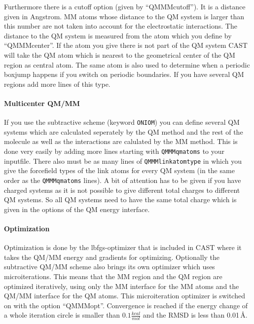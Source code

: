 \documentclass[10pt,a4paper]{article} %
\begin{document}
Furthermore there is a cutoff option (given by ``QMMMcutoff''). It is a distance given in Angstrom. MM atoms whose distance to the QM system is larger than this number are not taken into account for the electrostatic interactions. The distance to the QM system is measured from the atom which you define by ``QMMMcenter''. If the atom you give there is not part of the QM system CAST will take the QM atom which is nearest to the geometrical center of the QM region as central atom. The same atom is also used to determine when a periodic boxjump happens if you switch on periodic boundaries. If you have several QM regions add more lines of this type.

\paragraph{Multicenter QM/MM\\}

If you use the subtractive scheme (keyword \texttt{ONIOM}) you can define several QM systems which are calculated seperately by the QM method and the rest of the molecule as well as the interactions are calulated by the MM method. This is done very easily by adding more lines starting with \texttt{QMMMqmatoms} to your inputfile. There also must be as many lines of \texttt{QMMMlinkatomtype} in which you give the forcefield types of the link atoms for every QM system (in the same order as the \texttt{QMMMqmatoms} lines). A bit of attention has to be given if you have charged systems as it is not possible to give different total charges to different QM systems. So all QM systems need to have the same total charge which is given in the options of the QM energy interface.

\paragraph{Optimization\\}

Optimization is done by the lbfgs-optimizer that is included in CAST where it takes the QM/MM energy and gradients for optimizing. Optionally the subtractive QM/MM scheme also brings its own optimizer which uses microiterations. This means that the MM region and the QM region are optimized iteratively, using only the MM interface for the MM atoms and the QM/MM interface for the QM atoms. This microiteration optimizer is switched on with the option ``QMMMopt''. Convergence is reached if the energy change of a whole iteration circle is smaller than $0.1 \frac{kcal}{mol}$ and the RMSD is less than 0.01\,\AA.
\\
\end{document}
